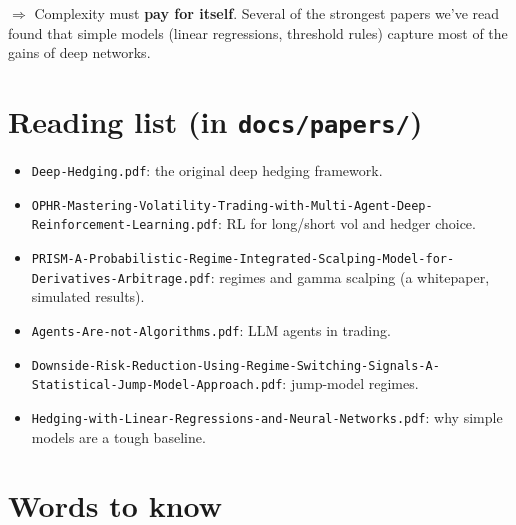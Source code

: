 \documentclass{article}
\begin{document}
\textbf{$\Rightarrow$} Complexity must \textbf{pay for itself}. Several of the strongest papers we've read found that simple models (linear regressions, threshold rules) capture most of the gains of deep networks.

\section{Reading list (in \texttt{docs/\allowbreak{}papers/\allowbreak{}})}

\begin{itemize}

\item \texttt{Deep-\allowbreak{}Hedging.\allowbreak{}pdf}: the original deep hedging framework.

\item \texttt{OPHR-\allowbreak{}Mastering-\allowbreak{}Volatility-\allowbreak{}Trading-\allowbreak{}with-\allowbreak{}Multi-\allowbreak{}Agent-\allowbreak{}Deep-\allowbreak{}Reinforcement-\allowbreak{}Learning.\allowbreak{}pdf}: RL for long/\allowbreak{}short vol and hedger choice.

\item \texttt{PRISM-\allowbreak{}A-\allowbreak{}Probabilistic-\allowbreak{}Regime-\allowbreak{}Integrated-\allowbreak{}Scalping-\allowbreak{}Model-\allowbreak{}for-\allowbreak{}Derivatives-\allowbreak{}Arbitrage.\allowbreak{}pdf}: regimes and gamma scalping (a whitepaper, simulated results).

\item \texttt{Agents-\allowbreak{}Are-\allowbreak{}not-\allowbreak{}Algorithms.\allowbreak{}pdf}: LLM agents in trading.

\item \texttt{Downside-\allowbreak{}Risk-\allowbreak{}Reduction-\allowbreak{}Using-\allowbreak{}Regime-\allowbreak{}Switching-\allowbreak{}Signals-\allowbreak{}A-\allowbreak{}Statistical-\allowbreak{}Jump-\allowbreak{}Model-\allowbreak{}Approach.\allowbreak{}pdf}: jump-model regimes.

\item \texttt{Hedging-\allowbreak{}with-\allowbreak{}Linear-\allowbreak{}Regressions-\allowbreak{}and-\allowbreak{}Neural-\allowbreak{}Networks.\allowbreak{}pdf}: why simple models are a tough baseline.

\end{itemize}

\section{Words to know}
\end{document}

